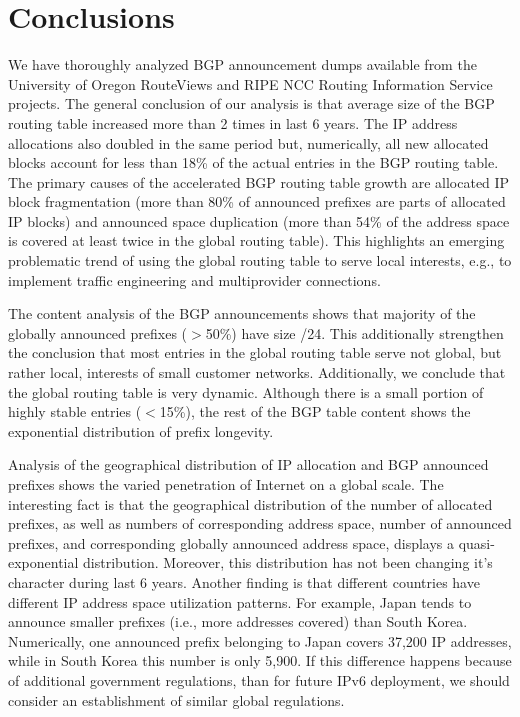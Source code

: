 \section{Conclusions}
\label{sec:conclusions}

We have thoroughly analyzed BGP announcement dumps available from the
University of Oregon RouteViews and RIPE NCC Routing Information Service
projects. The general conclusion of our analysis is that average size of the
BGP routing table increased more than 2 times in last 6 years. The IP address
allocations also doubled in the same period but, numerically, all new
allocated blocks account for less than 18\% of the actual entries in the BGP
routing table. The primary causes of the accelerated BGP routing table growth
are allocated IP block fragmentation (more than 80\% of announced prefixes are
parts of allocated IP blocks) and announced space duplication (more than 54\%
of the address space is covered at least twice in the global routing table).
This highlights an emerging problematic trend of using the global routing
table to serve local interests, e.g., to implement traffic engineering and
multiprovider connections.

The content analysis of the BGP announcements shows that majority of the
globally announced prefixes ($>$50\%) have size /24. This additionally
strengthen the conclusion that most entries in the global routing table serve
not global, but rather local, interests of small customer networks.
Additionally, we conclude that the global routing table is very dynamic.
Although there is a small portion of highly stable entries ($<$15\%), the rest
of the BGP table content shows the exponential distribution of prefix
longevity.

Analysis of the geographical distribution of IP allocation and BGP announced
prefixes shows the varied penetration of Internet on a global scale. The
interesting fact is that the geographical distribution of the number of
allocated prefixes, as well as numbers of corresponding address space, number
of announced prefixes, and corresponding globally announced address space,
displays a quasi-exponential distribution. Moreover, this distribution has not
been changing it's character during last 6 years. Another finding is that
different countries have different IP address space utilization patterns. For
example, Japan tends to announce smaller prefixes (i.e., more addresses
covered) than South Korea. Numerically, one announced prefix belonging to
Japan covers 37,200 IP addresses, while in South Korea this number is only
5,900. If this difference happens because of additional government
regulations, than for future IPv6 deployment, we should consider an
establishment of similar global regulations.
